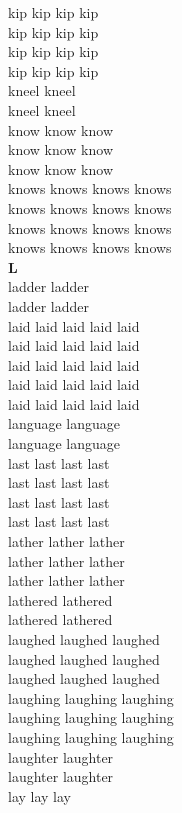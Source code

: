 kip kip kip kip\\
kip kip kip kip\\
kip kip kip kip\\
kip kip kip kip\\
kneel kneel\\
kneel kneel\\
know know know\\
know know know\\
know know know\\
knows knows knows knows\\
knows knows knows knows\\
knows knows knows knows\\
knows knows knows knows\\


\vspace{14pt}
\noindent\textbf{\Large L}\\[+12pt]
ladder ladder\\
ladder ladder\\
laid laid laid laid laid\\
laid laid laid laid laid\\
laid laid laid laid laid\\
laid laid laid laid laid\\
laid laid laid laid laid\\
language language\\
language language\\
last last last last\\
last last last last\\
last last last last\\
last last last last\\
lather lather lather\\
lather lather lather\\
lather lather lather\\
lathered lathered\\
lathered lathered\\
laughed laughed laughed\\
laughed laughed laughed\\
laughed laughed laughed\\
laughing laughing laughing\\
laughing laughing laughing\\
laughing laughing laughing\\
laughter laughter\\
laughter laughter\\
lay lay lay\\
